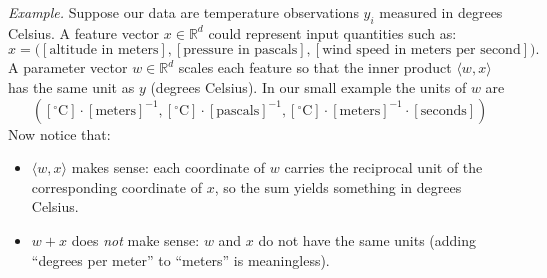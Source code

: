 \noindent
\textit{Example.} Suppose our data are temperature observations $y_i$ measured in degrees Celsius. A feature vector $x \in \mathbb{R}^d$ could represent input quantities such as:
\[
x = \big([\text{altitude in meters}], [\text{pressure in pascals}], [\text{wind speed in meters per second}] \big).
\]
A parameter vector $w \in \mathbb{R}^d$ scales each feature so that the inner product $\langle w, x \rangle$
has the same unit as $y$ (degrees Celsius). In our small example the units of $w$ are 
\[ ([^\circ\mathrm{C}] \cdot [\text{meters}]^{-1}, [^\circ\mathrm{C}] \cdot [\text{pascals}]^{-1}, [^\circ\mathrm{C}] \cdot [\text{meters}]^{-1} \cdot [\text{seconds}]) \]
Now notice that:
\begin{itemize}
    \item $\langle w, x \rangle$ makes sense: each coordinate of $w$ carries the reciprocal unit of the corresponding coordinate of $x$, so the sum yields something in degrees Celsius.  
    \item $w + x$ does \emph{not} make sense: $w$ and $x$ do not have the same units (adding ``degrees per meter'' to ``meters'' is meaningless).  
\end{itemize}


